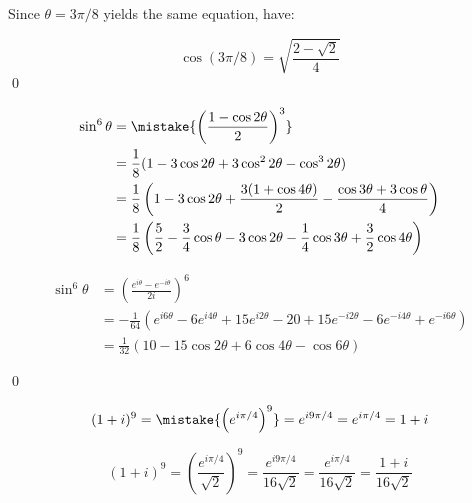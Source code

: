 \documentclass[12pt]{article}
\begin{document}
Since $\theta = 3\pi/8$ yields the same equation, have:

\begin{equation}
    \cos{(3\pi/8)} = \sqrt{\frac{2 - \sqrt{2}}{4}}
\end{equation}
\qed



\begin{equation}
    \begin{split}
        \sin^{6}{\theta} &= \mistake{\left( \frac{1 - \cos{2\theta}}{2} \right)^{3}} \\
        &= \frac{1}{8} (1 - 3\cos{2\theta} + 3\cos^{2}{2\theta} - \cos^{3}{2\theta}) \\
        &= \frac{1}{8} \left( 1 - 3\cos{2\theta} + \frac{3(1 + \cos{4\theta})}{2} - \frac{\cos{3\theta} + 3\cos{\theta}}{4} \right) \\
        &= \frac{1}{8} \left( \frac{5}{2} - \frac{3}{4} \cos{\theta} - 3\cos{2\theta} - \frac{1}{4} \cos{3\theta} + \frac{3}{2} \cos{4\theta} \right)
    \end{split}
\end{equation}

\begin{correction}
    \begin{equation*}
        \begin{split}
            \sin^{6}{\theta} &= \left( \frac{e^{i\theta} - e^{-i\theta}}{2i} \right)^{6} \\
            &= -\frac{1}{64} \left( e^{i6\theta} - 6e^{i4\theta} + 15e^{i2\theta} - 20 + 15e^{-i2\theta} - 6e^{-i4\theta} + e^{-i6\theta} \right) \\
            &= \frac{1}{32} (10 - 15\cos{2\theta} + 6\cos{4\theta} - \cos{6\theta})
        \end{split}
    \end{equation*}
\end{correction}
\qed




\begin{equation}
    (1 + i)^{9} = \mistake{\left( e^{i \pi/4} \right)^{9}} = e^{i 9\pi/4} = e^{i \pi/4} = 1 + i
\end{equation}

\begin{correction}
    \begin{equation*}
        (1 + i)^{9} = \left( \frac{e^{i \pi/4}}{\sqrt{2}} \right)^{9} = \frac{e^{i 9\pi/4}}{16\sqrt{2}} = \frac{e^{i \pi/4}}{16\sqrt{2}} = \frac{1 + i}{16\sqrt{2}}
    \end{equation*}
\end{correction}
\end{document}
